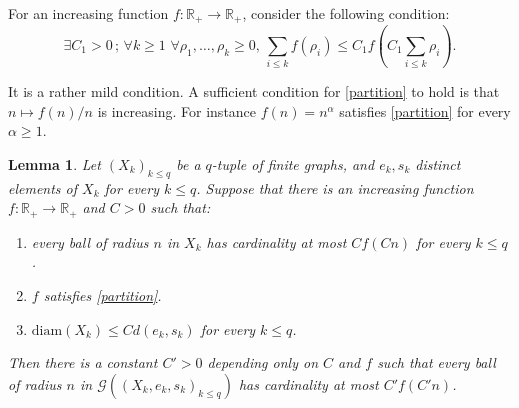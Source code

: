 \documentclass[11pt]{amsart}
\newcommand{\R}{\ensuremath{\mathbb{R}}}%
\theoremstyle{definition}
\theoremstyle{plain}
\newtheorem{lem}[defin]{Lemma}
\theoremstyle{remark}
\begin{document}
For an increasing function $f: \R_+ \to \R_+$, consider the following condition: \begin{equation} \label{partition} \exists C_1 > 0 \, ; \, \forall k \geq 1 \, \, \forall \rho_1,\ldots,\rho_k \geq 0, \, \sum_{i \leq k} f(\rho_i) \leq C_1 f \left(C_1 \sum_{i \leq k} \rho_i \right). \end{equation}


It is a rather mild condition. A sufficient condition for \eqref{partition} to hold is that $n \mapsto f(n) /n$ is increasing. For instance  $f(n) = n^\alpha$ satisfies \eqref{partition} for every $\alpha \ge 1$. 



\begin{lem} \label{lem-growth-m-control}
	Let $(X_k)_{k \leq q}$ be a $q$-tuple of finite graphs, and $e_k,s_k$ distinct elements of $X_k$ for every $k \leq q$. Suppose that there is an increasing function $f: \R_+ \to \R_+$ and $C > 0$ such that: \begin{enumerate}
		\item \label{growth-Xk} every ball of radius $n$ in $X_k$ has cardinality at most $C f(Cn)$ for every $k \leq q$.
		\item $f$ satisfies \eqref{partition}.
		\item \label{diam-Xk} $\mathrm{diam}(X_k) \leq C d(e_k,s_k)$ for every $k \leq q$.
	\end{enumerate}
	Then there is a constant $C'> 0$ depending only on $C$ and $f$ such that every ball of radius $n$ in $\mathcal{G}((X_k,e_k,s_k)_{k \leq q})$ has cardinality at most $C'  f(C' n)$. 
\end{lem}
\end{document}
